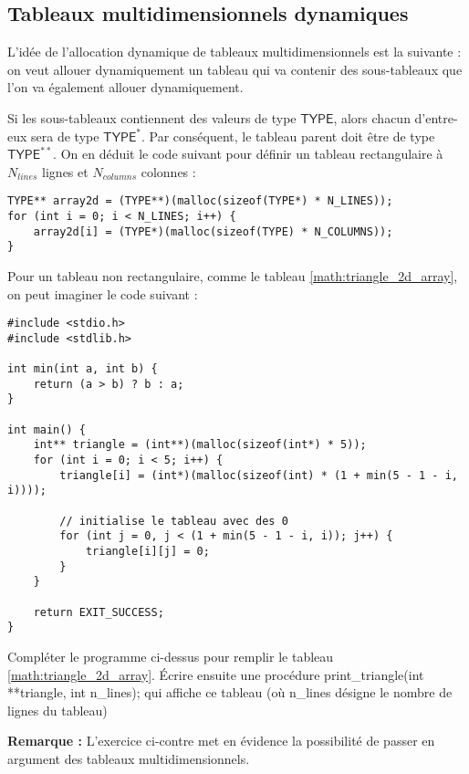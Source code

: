 \documentclass[../../../main.tex]{subfiles}
\begin{document}
\subsection{Tableaux multidimensionnels dynamiques}
L'idée de l'allocation dynamique de tableaux multidimensionnels est la suivante : on veut allouer dynamiquement un tableau qui va contenir des sous-tableaux que l'on va également allouer dynamiquement.
 
\begin{minipage}{\textwidth}
	\begin{center}
		
	\end{center}
\end{minipage}
 
Si les sous-tableaux contiennent des valeurs de type $\textsf{TYPE}$, alors chacun d'entre-eux sera de type $\textsf{TYPE}^{*}$. Par conséquent, le tableau parent doit être de type $\textsf{TYPE}^{**}$. On en déduit le code suivant pour définir un tableau rectangulaire à $N_{lines}$ lignes et $N_{columns}$ colonnes :
\begin{verbatim}
TYPE** array2d = (TYPE**)(malloc(sizeof(TYPE*) * N_LINES));
for (int i = 0; i < N_LINES; i++) {
	array2d[i] = (TYPE*)(malloc(sizeof(TYPE) * N_COLUMNS));
}
\end{verbatim}
Pour un tableau non rectangulaire, comme le tableau \ref{math:triangle_2d_array}, on peut imaginer le code suivant :
\begin{verbatim}
#include <stdio.h>
#include <stdlib.h>

int min(int a, int b) {
	return (a > b) ? b : a;
}

int main() {
	int** triangle = (int**)(malloc(sizeof(int*) * 5));
	for (int i = 0; i < 5; i++) {
		triangle[i] = (int*)(malloc(sizeof(int) * (1 + min(5 - 1 - i, i))));
		
		// initialise le tableau avec des 0
		for (int j = 0, j < (1 + min(5 - 1 - i, i)); j++) {
			triangle[i][j] = 0;
		}
	}
	
	return EXIT_SUCCESS;
}
\end{verbatim}
 Compléter le programme ci-dessus pour remplir le tableau \ref{math:triangle_2d_array}. Écrire ensuite une procédure \textsf{print\_triangle(int **triangle, int n\_lines);} qui affiche ce tableau (où \textsf{n\_lines} désigne le nombre de lignes du tableau)
 
\textbf{Remarque :} L'exercice ci-contre met en évidence la possibilité de passer en argument des tableaux multidimensionnels.
\end{document}
